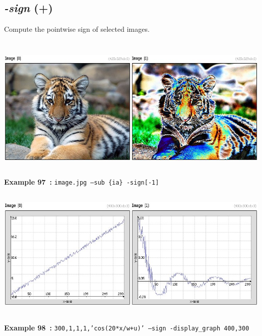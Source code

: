 \documentclass[a4paper,11pt,twoside]{book}
\begin{document}
\subsection{\emph{-sign} (+)}\vspace*{-0.5em}
Compute the pointwise sign of selected images.
\begin{center}\includegraphics[keepaspectratio=true,height=7cm,width=\textwidth]{img/gmic_def97.jpg}\\
{\footnotesize \textbf{Example 97~:} \texttt{image.jpg --sub \{ia\} -sign[-1]}}
\\\includegraphics[keepaspectratio=true,height=7cm,width=\textwidth]{img/gmic_def98.jpg}\\
{\footnotesize \textbf{Example 98~:} \texttt{300,1,1,1,'cos(20*x/w+u)' --sign -display\_graph 400,300}}
\end{center}
\end{document}
